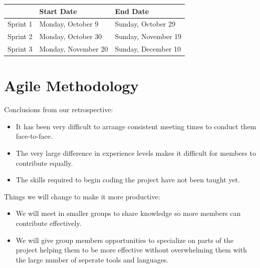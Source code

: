 \documentclass{article}
\begin{document}
  \begin{center}
    \begin{tabular}{l|l|l}
      ~ & Start Date & End Date \\ \hline
      Sprint 1 & Monday, October 9 & Sunday, October 29 \\
      Sprint 2 & Monday, October 30 & Sunday, November 19 \\
      Sprint 3 & Monday, November 20 & Sunday, December 10
    \end{tabular}
  \end{center}

  \section*{Agile Methodology}
  Conclusions from our retrospective:
  \begin{itemize}
    \item It has been very difficult to arrange consistent meeting times to
      conduct them face-to-face.
    \item The very large difference in experience levels makes it difficult for
      members to contribute equally.
    \item The skills required to begin coding the project have not been taught
      yet.
  \end{itemize}
  \vspace{1cm}
  Things we will change to make it more productive:
  \begin{itemize}
    \item We will meet in smaller groups to share knowledge so more members can
      contribute effectively.
    \item We will give group members opportunities to specialize on parts of the
      project helping them to be more effective without overwhelming them with
      the large number of seperate tools and languages.
  \end{itemize}
\end{document}
